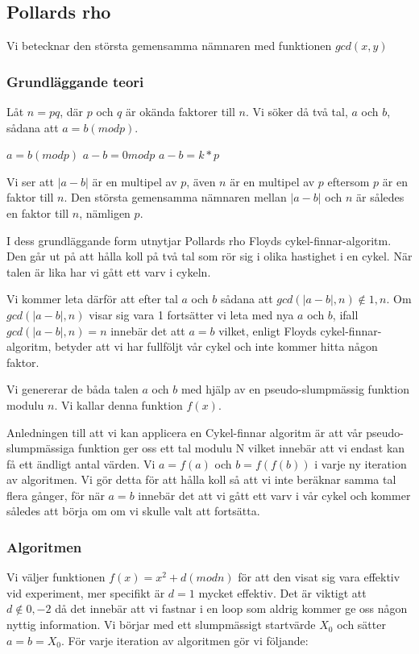 \documentclass[a4paper,12pt]{article}
\renewcommand{\*}{\ensuremath{\cdot}}
\begin{document}
\subsection{Pollards rho}

Vi betecknar den största gemensamma nämnaren med funktionen $gcd(x,y)$
\subsubsection{Grundläggande teori}

Låt $n = pq$, där $p$ och $q$ är okända faktorer till $n$. 
Vi söker då två tal, $a$ och $b$, sådana att $a = b (mod p)$.

$a=b(mod p)$
$a-b = 0 mod p$
$a - b = k*p$

Vi ser att $|a-b|$ är en multipel av $p$, även $n$ är en multipel av $p$ eftersom $p$ är en faktor till $n$. Den största gemensamma nämnaren mellan $|a-b|$ och $n$ är således en faktor till $n$, nämligen $p$. 

I dess grundläggande form utnytjar Pollards rho Floyds cykel-finnar-algoritm. Den går ut på att hålla koll på två tal som rör sig i olika hastighet i en cykel. När talen är lika har vi gått ett varv i cykeln.

Vi kommer leta därför att efter tal $a$ och $b$ sådana att $gcd(|a-b|, n) \notin {1, n}$. Om $gcd(|a-b|, n)$ visar sig vara 1 fortsätter vi leta med nya $a$ och $b$, ifall $gcd(|a-b|, n) = n$ innebär det att $a=b$ vilket, enligt Floyds cykel-finnar-algoritm, betyder att vi har fullföljt vår cykel och inte kommer hitta någon faktor.

Vi genererar de båda talen $a$ och $b$ med hjälp av en pseudo-slumpmässig funktion modulu $n$. Vi kallar denna funktion $f(x)$.

Anledningen till att vi kan applicera en Cykel-finnar algoritm är att vår pseudo-slumpmässiga funktion ger oss ett tal modulu N vilket innebär att vi endast kan få ett ändligt antal värden. Vi $a=f(a)$ och $b=f(f(b))$ i varje ny iteration av algoritmen. Vi gör detta för att hålla koll så att vi inte beräknar samma tal flera gånger, för när $a=b$ innebär det att vi gått ett varv i vår cykel och kommer således att börja om om vi skulle valt att fortsätta.

\subsubsection{Algoritmen}
Vi väljer funktionen $f(x) = x^2 + d (mod n)$ för att den visat sig vara effektiv vid experiment, mer specifikt är $d=1$ mycket effektiv. Det är viktigt att $d \notin {0, -2}$ då det innebär att vi  fastnar i en loop som aldrig kommer ge oss någon nyttig information. Vi börjar med ett slumpmässigt startvärde $X_0$ och sätter $a=b=X_0$. För varje iteration av algoritmen gör vi följande:
\end{document}
